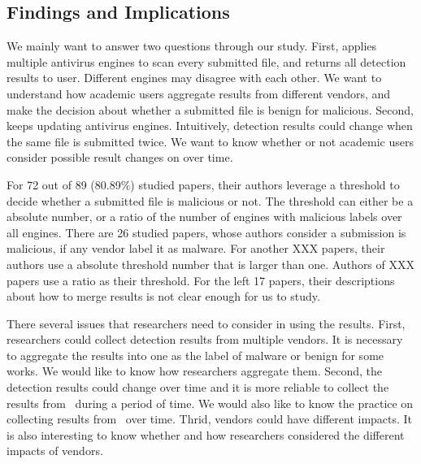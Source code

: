 \subsection{Findings and Implications}
We mainly want to answer two questions through our study.
First, \vt{} applies multiple antivirus engines to scan every submitted file, 
and returns all detection results to user.
Different engines may disagree with each other.
We want to understand how academic users aggregate results from different vendors,
and make the decision about whether a submitted file is benign for malicious. 
Second, \vt{} keeps updating antivirus engines. 
Intuitively, detection results could change when the same file is submitted twice.
We want to know whether or not academic users consider 
possible result changes on \vt{} over time.   
 

For 72 out of 89 (80.89\%) studied papers, 
their authors leverage a threshold to decide whether a submitted file is 
malicious or not. 
The threshold can either be a absolute number, 
or a ratio of the number of engines with malicious labels over all engines.
There are 26 studied papers, 
whose authors consider a submission is malicious, 
if any vendor label it as malware. 
For another {\color{red} XXX} papers, their authors 
use a absolute threshold number that is larger than one. 
Authors of {\color{red} XXX} papers use a ratio as their threshold. 
For the left 17 papers, their descriptions about how to merge results 
is not clear enough for us to study. 







There several issues that researchers need to consider in using the results. 
First, researchers could collect detection results from multiple vendors. 
It is necessary to aggregate the results into one as the label of malware or benign for some works. 
We would like to know how researchers aggregate them. 
Second, the detection results could change over time and it is more reliable to collect the results from \vt\ during a period of time. 
We would also like to know the practice on collecting results from \vt\ over time. 
Thrid, vendors could have different impacts. 
It is also interesting to know whether and how researchers considered the different impacts of vendors.

